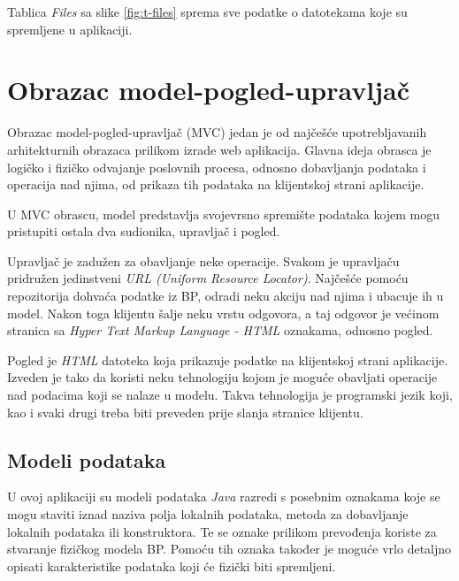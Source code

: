 \documentclass[zavrsni, numeric]{fer}
\begin{document}
Tablica \textit{Files} sa slike \ref{fig:t-files} sprema sve podatke o datotekama koje su spremljene u aplikaciji.

\section{Obrazac model-pogled-upravljač}
Obrazac model-pogled-upravljač (MVC) jedan je od najčešće upotrebljavanih arhitekturnih obrazaca prilikom izrade web aplikacija. Glavna ideja obrasca je logičko i fizičko odvajanje poslovnih procesa, odnosno dobavljanja podataka i operacija nad njima, od prikaza tih podataka na klijentskoj strani aplikacije.  

U MVC obrascu, model predstavlja svojevrsno spremište podataka kojem mogu pristupiti ostala dva sudionika, upravljač i pogled. 

Upravljač je zadužen za obavljanje neke operacije. Svakom je upravljaču pridružen jedinstveni \textit{URL (Uniform Resource Locator)}. Najčešće pomoću repozitorija dohvaća podatke iz BP, odradi neku akciju nad njima i ubacuje ih u model. Nakon toga klijentu šalje neku vrstu odgovora, a taj odgovor je većinom stranica sa \textit{Hyper Text Markup Language - HTML} oznakama, odnosno pogled.

Pogled je \textit{HTML} datoteka koja prikazuje podatke na klijentskoj strani aplikacije. Izveden je tako da koristi neku tehnologiju kojom je moguće obavljati operacije nad podacima koji se nalaze u modelu. Takva tehnologija je programski jezik koji, kao i svaki drugi treba biti preveden prije slanja stranice klijentu. 

\subsection{Modeli podataka}
U ovoj aplikaciji su modeli podataka \textit{Java} razredi s posebnim oznakama koje se mogu staviti iznad naziva polja lokalnih podataka, metoda za dobavljanje lokalnih podataka ili konstruktora. Te se oznake prilikom prevođenja koriste za stvaranje fizičkog modela BP. Pomoću tih oznaka također je moguće vrlo detaljno opisati karakteristike podataka koji će fizički biti spremljeni. 
\end{document}

